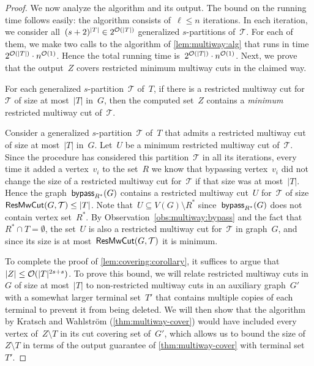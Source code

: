 \begin{proof}
We now analyze the algorithm and its output. The bound on the running time follows easily: the algorithm consists of~$\ell \leq n$ iterations. In each iteration, we consider all~$(s+2)^{|T|} \in 2^{\mathcal{O}(|T|)}$ generalized $s$-partitions of~$\mathcal{T}$. For each of them, we make two calls to the algorithm of \cref{lem:multiway:alg} that runs in time~$2^{\mathcal{O}(|T|)} \cdot n^{\mathcal{O}(1)}$. Hence the total running time is~$2^{\mathcal{O}(|T|)} \cdot n^{\mathcal{O}(1)}$. Next, we prove that the output~$Z$ covers restricted minimum multiway cuts in the claimed way.

\begin{claim}
For each generalized $s$-partition~$\mathcal{T}$ of~$T$, if there is a restricted multiway cut for~$\mathcal{T}$ of size at most~$|T|$ in~$G$, then the computed set~$Z$ contains a \emph{minimum} restricted multiway cut of~$\mathcal{T}$.
\end{claim}
\begin{claimproof}
Consider a generalized $s$-partition~$\mathcal{T}$ of~$T$ that admits a restricted multiway cut of size at most~$|T|$ in~$G$. Let~$U$ be a minimum restricted multiway cut of~$\mathcal{T}$. Since the procedure has considered this partition~$\mathcal{T}$ in all its iterations, every time it added a vertex~$v_i$ to the set~$R$ we know that bypassing vertex~$v_i$ did not change the size of a restricted multiway cut for~$\mathcal{T}$ if that size was at most~$|T|$. Hence the graph~$\mathsf{bypass}_{R^*}(G)$ contains a restricted multiway cut~$U$ for~$\mathcal{T}$ of size~$\mathsf{ResMwCut}(G, \mathcal{T}) \leq |T|$. Note that~$U \subseteq V(G) \setminus R^*$ since~$\mathsf{bypass}_{R^*}(G)$ does not contain vertex set~$R^*$. By Observation~\ref{obs:multiway:bypass} and the fact that~$R^* \cap T = \emptyset$, the set~$U$ is also a restricted multiway cut for~$\mathcal{T}$ in graph~$G$, and since its size is at most~$\mathsf{ResMwCut}(G, \mathcal{T})$ it is minimum.
\end{claimproof}

To complete the proof of \cref{lem:covering:corollary}, it suffices to argue that~$|Z| \leq \mathcal{O}(|T|^{2s+s})$. To prove this bound, we will relate restricted multiway cuts in~$G$ of size at most~$|T|$ to non-restricted multiway cuts in an auxiliary graph~$G'$ with a somewhat larger terminal set~$T'$ that contains multiple copies of each terminal to prevent it from being deleted. We will then show that the algorithm by Kratsch and Wahlstr\"{o}m (\cref{thm:multiway-cover}) would have included every vertex of~$Z \setminus T$ in its cut covering set of~$G'$, which allows us to bound the size of~$Z \setminus T$ in terms of the output guarantee of \cref{thm:multiway-cover} with terminal set~$T'$.


\end{proof}
